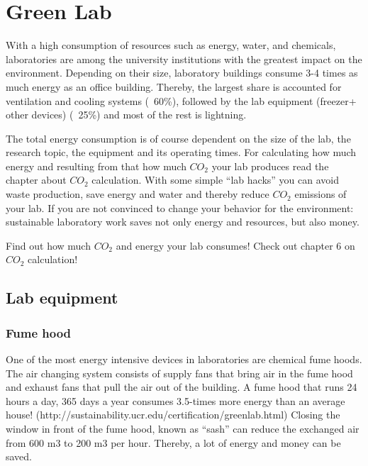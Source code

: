 
\chapter{Green Lab}\label{chap:lab}

With a high consumption of resources such as energy, water, and chemicals, laboratories are among the university institutions with the greatest impact on the environment. Depending on their size, laboratory buildings consume 3-4 times as much energy as an office building. Thereby, the largest share is accounted for ventilation and cooling systems (~60\%), followed by the lab equipment (freezer+ other devices) (~25\%) and most of the rest is lightning. 

The total energy consumption is of course dependent on the size of the lab, the research topic, the equipment and its operating times. For calculating how much energy and resulting from that how much $CO_2$ your lab produces read the chapter about $CO_{2}$ calculation. 
With some simple “lab hacks” you can avoid waste production, save energy and water and thereby reduce $CO_{2}$ emissions of your lab. 
If you are not convinced to change your behavior for the environment: sustainable laboratory work saves not only energy and resources, but also money.

\begin{suggest}{Find out how much $CO_2$ and energy your lab consumes!}
	Check out chapter 6 on $CO_2$ calculation!
\end{suggest}

\section{Lab equipment}

\subsection{Fume hood}
One of the most energy intensive devices in laboratories are chemical fume hoods. The air changing system consists of supply fans that bring air in the fume hood and exhaust fans that pull the air out of the building.  A fume hood that runs 24 hours a day, 365 days a year consumes 3.5-times more energy than an average house! (http://sustainability.ucr.edu/certification/greenlab.html) Closing the window in front of the fume hood, known as “sash” can reduce the exchanged air from 600 m3 to 200 m3 per hour. Thereby, a lot of energy and money can be saved.

